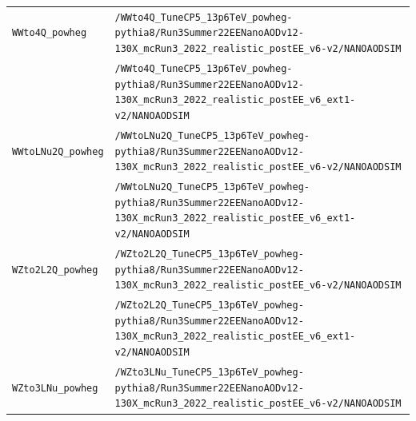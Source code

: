 \begin{longtable}{@{}>{\RaggedRight\arraybackslash}p{} >{\RaggedRight\arraybackslash}p{}@{}}
\addlinespace[2pt]
\texttt{WWto4Q\_\allowbreak{}powheg} & \texttt{/\allowbreak{}WWto4Q\_\allowbreak{}TuneCP5\_\allowbreak{}13p6TeV\_\allowbreak{}powheg-\allowbreak{}pythia8/\allowbreak{}Run3Summer22EENanoAODv12-\allowbreak{}130X\_\allowbreak{}mcRun3\_\allowbreak{}2022\_\allowbreak{}realistic\_\allowbreak{}postEE\_\allowbreak{}v6-\allowbreak{}v2/\allowbreak{}NANOAODSIM} \\
 & \texttt{/\allowbreak{}WWto4Q\_\allowbreak{}TuneCP5\_\allowbreak{}13p6TeV\_\allowbreak{}powheg-\allowbreak{}pythia8/\allowbreak{}Run3Summer22EENanoAODv12-\allowbreak{}130X\_\allowbreak{}mcRun3\_\allowbreak{}2022\_\allowbreak{}realistic\_\allowbreak{}postEE\_\allowbreak{}v6\_\allowbreak{}ext1-\allowbreak{}v2/\allowbreak{}NANOAODSIM} \\
\addlinespace[2pt]
\texttt{WWtoLNu2Q\_\allowbreak{}powheg} & \texttt{/\allowbreak{}WWtoLNu2Q\_\allowbreak{}TuneCP5\_\allowbreak{}13p6TeV\_\allowbreak{}powheg-\allowbreak{}pythia8/\allowbreak{}Run3Summer22EENanoAODv12-\allowbreak{}130X\_\allowbreak{}mcRun3\_\allowbreak{}2022\_\allowbreak{}realistic\_\allowbreak{}postEE\_\allowbreak{}v6-\allowbreak{}v2/\allowbreak{}NANOAODSIM} \\
 & \texttt{/\allowbreak{}WWtoLNu2Q\_\allowbreak{}TuneCP5\_\allowbreak{}13p6TeV\_\allowbreak{}powheg-\allowbreak{}pythia8/\allowbreak{}Run3Summer22EENanoAODv12-\allowbreak{}130X\_\allowbreak{}mcRun3\_\allowbreak{}2022\_\allowbreak{}realistic\_\allowbreak{}postEE\_\allowbreak{}v6\_\allowbreak{}ext1-\allowbreak{}v2/\allowbreak{}NANOAODSIM} \\
\addlinespace[2pt]
\texttt{WZto2L2Q\_\allowbreak{}powheg} & \texttt{/\allowbreak{}WZto2L2Q\_\allowbreak{}TuneCP5\_\allowbreak{}13p6TeV\_\allowbreak{}powheg-\allowbreak{}pythia8/\allowbreak{}Run3Summer22EENanoAODv12-\allowbreak{}130X\_\allowbreak{}mcRun3\_\allowbreak{}2022\_\allowbreak{}realistic\_\allowbreak{}postEE\_\allowbreak{}v6-\allowbreak{}v2/\allowbreak{}NANOAODSIM} \\
 & \texttt{/\allowbreak{}WZto2L2Q\_\allowbreak{}TuneCP5\_\allowbreak{}13p6TeV\_\allowbreak{}powheg-\allowbreak{}pythia8/\allowbreak{}Run3Summer22EENanoAODv12-\allowbreak{}130X\_\allowbreak{}mcRun3\_\allowbreak{}2022\_\allowbreak{}realistic\_\allowbreak{}postEE\_\allowbreak{}v6\_\allowbreak{}ext1-\allowbreak{}v2/\allowbreak{}NANOAODSIM} \\
\addlinespace[2pt]
\texttt{WZto3LNu\_\allowbreak{}powheg} & \texttt{/\allowbreak{}WZto3LNu\_\allowbreak{}TuneCP5\_\allowbreak{}13p6TeV\_\allowbreak{}powheg-\allowbreak{}pythia8/\allowbreak{}Run3Summer22EENanoAODv12-\allowbreak{}130X\_\allowbreak{}mcRun3\_\allowbreak{}2022\_\allowbreak{}realistic\_\allowbreak{}postEE\_\allowbreak{}v6-\allowbreak{}v2/\allowbreak{}NANOAODSIM} \\

\end{longtable}
